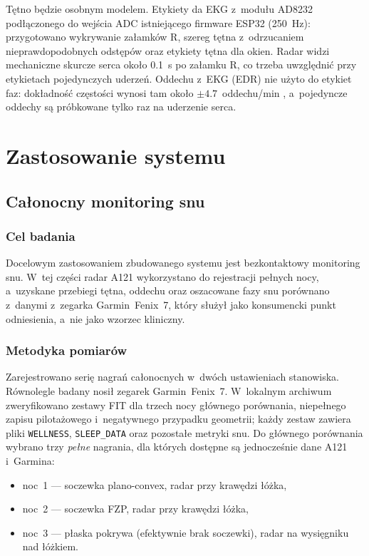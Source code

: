 \documentclass[12pt,a4paper,oneside]{report}
\begin{document}
Tętno będzie osobnym modelem. Etykiety da EKG z~modułu AD8232 podłączonego do
wejścia ADC istniejącego firmware ESP32 (\SI{250}{Hz}): przygotowano
wykrywanie załamków R, szereg tętna z~odrzucaniem nieprawdopodobnych
odstępów oraz etykiety tętna dla okien. Radar widzi mechaniczne skurcze serca
około \SI{0.1}{s} po załamku R, co trzeba uwzględnić przy etykietach
pojedynczych uderzeń. Oddechu z~EKG (EDR) nie użyto do etykiet faz:
dokładność częstości wynosi tam około $\pm 4.7$~oddechu/min \cite{charlton2016},
a~pojedyncze oddechy są próbkowane tylko raz na uderzenie serca.

\part{Zastosowanie systemu}
\label{part:eksperymenty}

\chapter{Całonocny monitoring snu}
\label{chap:sen}

\section{Cel badania}
Docelowym zastosowaniem zbudowanego systemu jest bezkontaktowy monitoring snu.
W~tej części radar A121 wykorzystano do rejestracji pełnych nocy, a~uzyskane
przebiegi tętna, oddechu oraz oszacowane fazy snu porównano z~danymi
z~zegarka Garmin~Fenix~7, który służył jako konsumencki punkt odniesienia,
a~nie jako wzorzec kliniczny.

\section{Metodyka pomiarów}
Zarejestrowano serię nagrań całonocnych w~dwóch ustawieniach stanowiska.
Równolegle badany nosił zegarek Garmin~Fenix~7. W~lokalnym archiwum
zweryfikowano zestawy FIT dla trzech nocy głównego porównania, niepełnego
zapisu pilotażowego i~negatywnego przypadku geometrii; każdy zestaw
zawiera pliki \texttt{WELLNESS}, \texttt{SLEEP\_DATA} oraz pozostałe metryki
snu. Do głównego porównania wybrano trzy \emph{pełne} nagrania, dla których
dostępne są jednocześnie dane A121 i~Garmina:
\begin{itemize}
  \item noc~1 --- soczewka plano-convex, radar przy krawędzi łóżka,
  \item noc~2 --- soczewka FZP, radar przy krawędzi łóżka,
  \item noc~3 --- płaska pokrywa (efektywnie brak soczewki), radar na
  wysięgniku nad łóżkiem.
\end{itemize}
\end{document}
